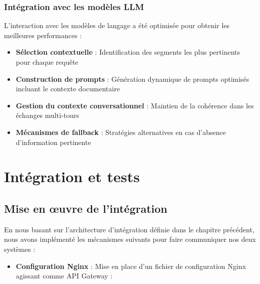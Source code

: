 \subsubsection{Intégration avec les modèles LLM}

L'interaction avec les modèles de langage a été optimisée pour obtenir les meilleures performances :

\begin{itemize}
  \item \textbf{Sélection contextuelle} : Identification des segments les plus pertinents pour chaque requête
  
  \item \textbf{Construction de prompts} : Génération dynamique de prompts optimisés incluant le contexte documentaire
  
  \item \textbf{Gestion du contexte conversationnel} : Maintien de la cohérence dans les échanges multi-tours
  
  \item \textbf{Mécanismes de fallback} : Stratégies alternatives en cas d'absence d'information pertinente
\end{itemize}

\section{Intégration et tests}

\subsection{Mise en œuvre de l'intégration}

En nous basant sur l'architecture d'intégration définie dans le chapitre précédent, nous avons implémenté les mécanismes suivants pour faire communiquer nos deux systèmes :

\begin{itemize}
  \item \textbf{Configuration Nginx} : Mise en place d'un fichier de configuration Nginx agissant comme API Gateway :
\end{itemize}

